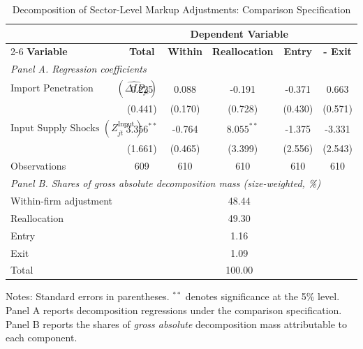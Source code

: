 \documentclass[12pt]{article}
\begin{document}
\begin{table}[htbp]
\centering
\caption{Decomposition of Sector-Level Markup Adjustments: Comparison Specification}
\label{tab:decomposition_results_alt}
\begin{threeparttable}
\begin{tabular}{lccccc}
\toprule
& \multicolumn{5}{c}{\textbf{Dependent Variable}} \\
\cmidrule(lr){2-6}
\textbf{Variable} & \textbf{Total} & \textbf{Within} & \textbf{Reallocation} & \textbf{Entry} & \textbf{- Exit} \\
\midrule
\multicolumn{6}{l}{\textit{Panel A. Regression coefficients}} \\
\addlinespace[2pt]
$\text{Import Penetration Change }(\widehat{\Delta IP}_{jt})$
& 0.225 & 0.088 & -0.191 & -0.371 & 0.663 \\
& (0.441) & (0.170) & (0.728) & (0.430) & (0.571) \\

$\text{Input Supply Shocks }(Z_{jt}^{\text{Input}})$
& $3.356^{**}$ & -0.764 & $8.055^{**}$ & -1.375 & -3.331 \\
& (1.661) & (0.465) & (3.399) & (2.556) & (2.543) \\
\midrule
Observations & 609 & 610 & 610 & 610 & 610 \\
\midrule
\multicolumn{6}{l}{\textit{Panel B. Shares of gross absolute decomposition mass (size-weighted, \%)}} \\
\addlinespace[2pt]
Within-firm adjustment & \multicolumn{5}{c}{48.44} \\
Reallocation            & \multicolumn{5}{c}{49.30} \\
Entry                   & \multicolumn{5}{c}{1.16}  \\
Exit                    & \multicolumn{5}{c}{1.09}  \\
\midrule
Total                   & \multicolumn{5}{c}{100.00} \\
\bottomrule
\end{tabular}
\begin{tablenotes}
\small
\item Notes: Standard errors in parentheses. $^{**}$ denotes significance at the 5\% level. 
Panel A reports decomposition regressions under the comparison specification. 
Panel B reports the shares of \emph{gross absolute} decomposition mass attributable to each component.
\end{tablenotes}
\end{threeparttable}
\end{table}
\end{document}
